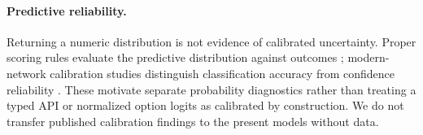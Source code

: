 \paragraph{Predictive reliability.}
Returning a numeric distribution is not evidence of calibrated uncertainty.
Proper scoring rules evaluate the predictive distribution against outcomes
\cite{gneiting2007proper}; modern-network calibration studies distinguish
classification accuracy from confidence reliability \cite{guo2017calibration}.
These motivate separate probability diagnostics rather than treating a typed
API or normalized option logits as calibrated by construction. We do not
transfer published calibration findings to the present models without data.
